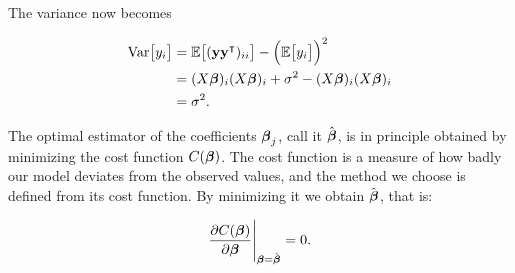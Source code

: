The variance now becomes

\begin{align*}
    \text{Var}\big[y_i\big] &= \mathbb{E}\big[(\mathbf{y}\mathbf{y}^\intercal)_{ii}\big] -\Big(\mathbb{E}\big[y_i\big]\Big)^2\\
    &= (X\boldsymbol{\beta})_{i} (X\boldsymbol{\beta})_{i} + \sigma^2 - (X\boldsymbol{\beta})_{i} (X\boldsymbol{\beta})_{i}\\
    &= \sigma^2.
\end{align*}


The optimal estimator of the coefficients $\boldsymbol{\beta}_j$, call it $\hat{\boldsymbol{\beta}}$, is in principle obtained by minimizing the cost function $C(\boldsymbol{\beta})$. The cost function is a measure of how badly our model deviates from the observed values, and the method we choose is defined from its cost function. By minimizing it we obtain $\hat{\boldsymbol{\beta}}$, that is:

\begin{align}
    \pdv{C(\boldsymbol{\beta})}{\boldsymbol{\beta}}\Bigg|_{\boldsymbol{\beta}=\hat{\boldsymbol{\beta}}} = 0.
    \label{eq:general_LS}
\end{align}




